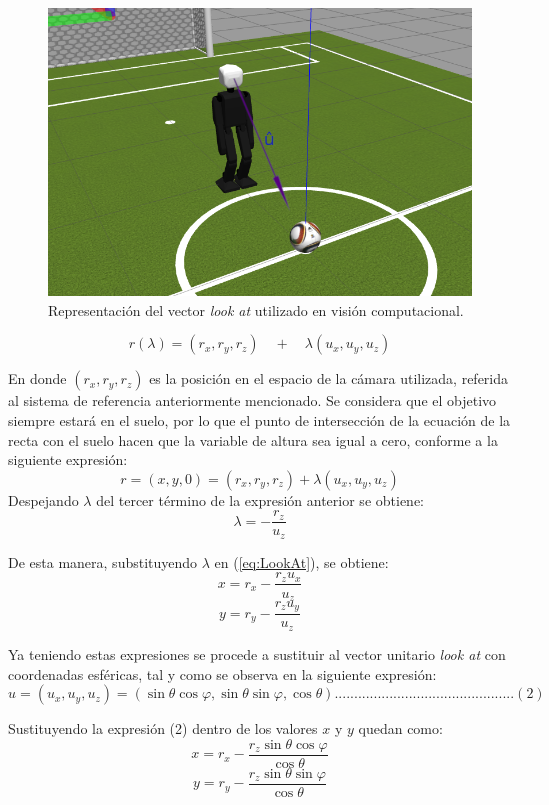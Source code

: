 \documentclass{book}
\begin{document}
\begin{figure}
	\centering		
	\includegraphics[scale=2]{images/robot_lookat.png}
	\caption{Representación del vector \textit{look at} utilizado en visión computacional.}		
	\label{fig:LookAt}
\end{figure}

\begin{equation}
\label{eq:LookAt}
r(\lambda) = (r_x, r_y, r_z)\quad +\quad \lambda (u_x, u_y, u_z)
\end{equation}


En donde $(r_x, r_y, r_z)$ es la posición en el espacio de la cámara utilizada, referida al sistema de referencia anteriormente mencionado. Se considera que el objetivo siempre estará en el suelo, por lo que el punto de intersección de la ecuación de la recta con el suelo hacen que la variable de altura sea igual a cero, conforme a la siguiente expresión:
\[r = (x, y, 0) = (r_x, r_y, r_z) + \lambda (u_x, u_y, u_z)\]
Despejando $\lambda$ del tercer término de la expresión anterior se obtiene:
\[\lambda = -\frac{r_z}{u_z}\]

De esta manera, substituyendo $\lambda$ en (\ref{eq:LookAt}), se obtiene:
\[x = r_x-\frac{r_z u_x}{u_z}\]
\[y = r_y-\frac{r_z u_y}{u_z}\]

Ya teniendo estas expresiones se procede a sustituir al vector unitario \textit{look at} con coordenadas esféricas, tal y como se observa en la siguiente expresión:
\[\hat{u}=(u_x, u_y, u_z)=(\sin{ \theta}\cos{\varphi},\sin{\theta}\sin{ \varphi},\cos{\theta})..............................................(2)\]

Sustituyendo la expresión (2) dentro de los valores $x$ y $y$ quedan como:
\[x=r_x - \frac{r_z \sin{ \theta} \cos{\varphi}}{\cos{\theta}}\]
\[y=r_y - \frac{r_z \sin{\theta} \sin{ \varphi}}{\cos{\theta}}\]
\end{document}
